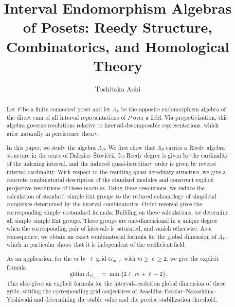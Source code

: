 \documentclass[a4paper,reqno]{amsart}
\title[Interval Endomorphism Algebras of Posets]{Interval Endomorphism Algebras of Posets: Reedy Structure, Combinatorics, and Homological Theory}
\author{Toshitaka Aoki}
\numberwithin{equation}{section}
\theoremstyle{italicbody}
\theoremstyle{romanbody}
\newcommand{\gldim}{\operatorname{gldim}}
\begin{document}
\begin{abstract}
Let $P$ be a finite connected poset and let $\Lambda_P$ be the opposite
endomorphism algebra of the direct sum of all interval representations
of $P$ over a field.
Via projectivization, this algebra governs resolutions relative to
interval-decomposable representations, which arise naturally in
persistence theory.

In this paper, we study the algebra $\Lambda_P$.
We first show that $\Lambda_P$ carries a Reedy algebra structure in the
sense of Dalezios--\v{S}\v{t}ov\'{\i}\v{c}ek.
Its Reedy degree is given by the cardinality of the indexing interval,
and the induced quasi-hereditary order is given by reverse interval
cardinality.
With respect to the resulting quasi-hereditary structure, we give a
concrete combinatorial description of the standard modules and construct
explicit projective resolutions of these modules.
Using these resolutions, we reduce the calculation of standard--simple
Ext groups to the reduced cohomology of simplicial complexes determined
by the interval combinatorics.  Order reversal gives the corresponding
simple--costandard formula.  Building on these calculations, we determine
all simple--simple Ext groups.
These groups are one-dimensional in a unique degree when the corresponding
pair of intervals is saturated, and vanish otherwise.
As a consequence, we obtain an exact combinatorial formula for the
global dimension of $\Lambda_P$, which in particular shows that it is
independent of the coefficient field.

As an application, for the $m$ by $\ell$ grid $G_{m,\ell}$ with
$m\geq\ell\geq2$, we give the explicit formula
\[
\gldim \Lambda_{G_{m,\ell}}
=
\min\{2\ell,m+\ell-2\}.
\]
This also gives an explicit formula for the interval-resolution global
dimension of these grids, settling the corresponding grid conjectures of Asashiba--Escolar--Nakashima--Yoshiwaki and determining the stable value and the precise stabilization threshold.
\end{abstract}

\maketitle


\tableofcontents


\end{document}
